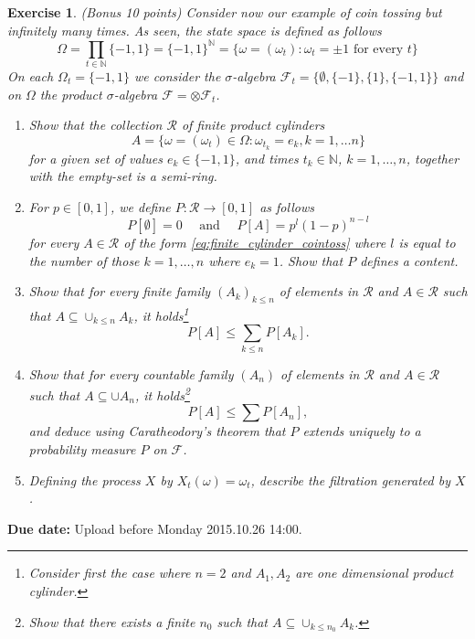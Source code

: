 \documentclass[DIV=classic,a4paper,10pt]{scrartcl}
\newtheorem{exercise}[theorem]{Exercise}
\theoremstyle{nonumberplain}
\numberwithin{equation}{section}
\begin{document}
\begin{exercise}(Bonus 10 points)
    Consider now our example of coin tossing but infinitely many times.
    As seen, the state  space is defined as follows
    \begin{equation*}
        \Omega=\prod_{t \in \mathbb{N}} \{-1,1\}=\{-1,1\}^{\mathbb{N}}=\{\omega=(\omega_t)\colon \omega_t =\pm 1\text{ for every }t\}
    \end{equation*}
    On each $\Omega_t=\{-1,1\}$ we consider the $\sigma$-algebra $\mathcal{F}_t=\{\emptyset,\{-1\},\{1\}, \{-1,1\}\}$ and on $\Omega$ the product $\sigma$-algebra $\mathcal{F}=\otimes\mathcal{F}_t$.
    \begin{enumerate}[label=(\alph*)]
        \item Show that the collection $\mathcal{R}$ of finite product cylinders
            \begin{equation}\label{eq:finite_cylinder_cointoss}
                A=\{\omega=(\omega_t) \in \Omega \colon \omega_{t_k}=e_k, k=1,\ldots n\}
            \end{equation}
            for a given set of values $e_k\in \{-1,1\}$, and times $t_k \in \mathbb{N}$, $k=1,\ldots,n$, together with the empty-set is a semi-ring.
        \item For $p\in [0,1]$, we define $P:\mathcal{R}\to [0,1]$ as follows
            \begin{equation*}
                P[\emptyset]=0\quad \text{ and }\quad P[A]=p^{l}(1-p)^{n-l}
            \end{equation*}
            for every $A \in \mathcal{R}$ of the form \eqref{eq:finite_cylinder_cointoss} where $l$ is equal to the number of those $k=1,\ldots,n$ where $e_k=1$.
            Show that $P$ defines a content.
        \item Show that for every finite family $(A_k)_{k\leq n}$ of elements in $\mathcal{R}$ and $A\in \mathcal{R}$ such that $A\subseteq \cup_{k\leq n}A_k$, it holds\footnote{Consider first the case where $n=2$ and $A_1,A_2$ are one dimensional product cylinder.}
            \begin{equation*}
                P[A]\leq \sum_{k\leq n}P[A_k].
            \end{equation*}
        \item Show that for every countable family $(A_n)$ of elements in $\mathcal{R}$ and $A\in \mathcal{R}$ such that $A\subseteq \cup A_n$, it holds\footnote{Show that there exists a finite $n_0$ such that $A\subseteq \cup_{k\leq n_0}A_k$.}
            \begin{equation*}
                P[A]\leq \sum P[A_n],
            \end{equation*}
            and deduce using Caratheodory's theorem that $P$ extends uniquely to a probability measure $P$ on $\mathcal{F}$.
        \item Defining the process $X$ by $X_t(\omega)=\omega_t$, describe the filtration generated by $X$.
    \end{enumerate}
\end{exercise}


\smallskip
\noindent
\textbf{Due date:} Upload before Monday 2015.10.26 14:00.
\end{document}

